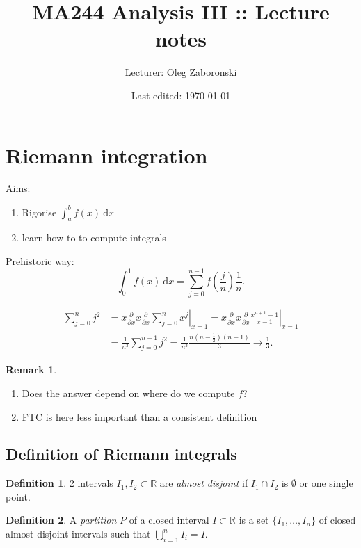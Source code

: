 \documentclass[a4paper]{article}
\title{MA244 Analysis III :: Lecture notes}
\author{Lecturer: Oleg Zaboronski}
\date{Last edited: \today}
\theoremstyle{definition}
\newtheorem{defn}{Definition}[subsection]
\newtheorem*{remark}{Remark}
\begin{document}
\maketitle
\thispagestyle{empty}

\tableofcontents
\thispagestyle{empty}
\newpage
\setcounter{page}{1}

\section{Riemann integration}
Aims: \begin{enumerate}
	\item Rigorise $\int_a^b f(x) \ \mathrm d x$
	\item learn how to to compute integrals
\end{enumerate}
Prehistoric way:
\[
\int_0^1 f(x) \ \mathrm d x = \sum_{j=0}^{n-1} f \left( \frac{j}{n} \right) \frac1n .
\]

\[
\begin{aligned}\sum_{j=0}^n j^2 &= x \frac{\partial}{\partial x} x \frac{\partial}{\partial x} \left. \sum_{j=0}^n x^j \right|_{x=1}=x \frac{\partial}{\partial x} x \frac{\partial}{\partial x} \left. \frac{x^{n+1}-1}{x-1} \right|_{x=1} \\ &=\frac{1}{n^3}\sum_{j=0}^{n-1}j^2 = \frac{1}{n^3}\frac{n(n-\frac12 )(n-1)}{3} \rightarrow \frac13 .\end{aligned}
\]

\begin{remark}
	\begin{enumerate}
		\item Does the answer depend on where do we compute $f$?
		\item FTC is here less important than a consistent definition
	\end{enumerate}
\end{remark}

\subsection{Definition of Riemann integrals}
\begin{defn}
	2 intervals $I_1, I_2 \subset \mathbb R$ are \textit{almost disjoint} if $I_1 \cap I_2 $ is $\emptyset$ or one single point.
\end{defn}

\begin{defn}
	A \textit{partition} $P$ of a closed interval $I \subset \mathbb R$ is a set $\{I_1,\ldots,I_n\}$ of closed almost disjoint intervals such that $\bigcup_{i=1}^n I_i=I$.
\end{defn}
\end{document}
